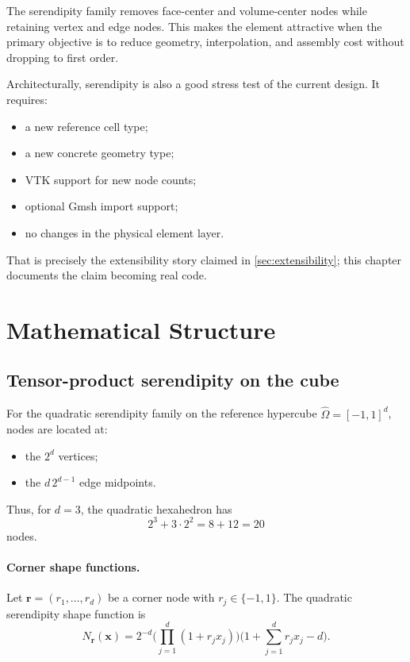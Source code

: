 The serendipity family removes face-center and volume-center nodes while
retaining vertex and edge nodes.  This makes the element attractive when the
primary objective is to reduce geometry, interpolation, and assembly cost
without dropping to first order.

Architecturally, serendipity is also a good stress test of the current design.
It requires:

\begin{itemize}[nosep]
  \item a new reference cell type;
  \item a new concrete geometry type;
  \item VTK support for new node counts;
  \item optional Gmsh import support;
  \item no changes in the physical element layer.
\end{itemize}

That is precisely the extensibility story claimed in
\cref{sec:extensibility}; this chapter documents the claim becoming real code.


\section{Mathematical Structure}
\label{sec:serendipity_math}

\subsection{Tensor-product serendipity on the cube}

For the quadratic serendipity family on the reference hypercube
\(\hat{\Omega} = [-1,1]^d\), nodes are located at:

\begin{itemize}[nosep]
  \item the \(2^d\) vertices;
  \item the \(d\,2^{d-1}\) edge midpoints.
\end{itemize}

Thus, for \(d=3\), the quadratic hexahedron has
\[
2^3 + 3 \cdot 2^2 = 8 + 12 = 20
\]
nodes.

\paragraph{Corner shape functions.}
Let \(\mathbf{r} = (r_1,\dots,r_d)\) be a corner node with \(r_j \in \{-1,1\}\).
The quadratic serendipity shape function is
\[
N_{\mathbf{r}}(\mathbf{x})
=
2^{-d}
\Bigg( \prod_{j=1}^{d}(1+r_j x_j) \Bigg)
\Bigg( 1 + \sum_{j=1}^{d} r_j x_j - d \Bigg).
\]

